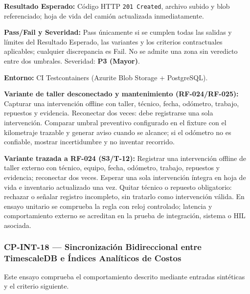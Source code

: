 \par\noindent\textbf{Resultado Esperado:} Código HTTP \texttt{2\allowbreak{}0\allowbreak{}1\allowbreak{} C\allowbreak{}r\allowbreak{}e\allowbreak{}a\allowbreak{}t\allowbreak{}e\allowbreak{}d\allowbreak{}}, archivo subido y blob referenciado; hoja de vida del camión actualizada inmediatamente.\par
\par\noindent\textbf{Pass/Fail y Severidad:} Pass únicamente si se cumplen todas las salidas y límites del Resultado Esperado, las variantes y los criterios contractuales aplicables; cualquier discrepancia es Fail. No se admite una zona sin veredicto entre dos umbrales. Severidad: \textbf{P3 (Mayor)}.\par
\par\noindent\textbf{Entorno:} CI Testcontainers (Azurite Blob Storage + PostgreSQL).\par




\par\noindent\textbf{Variante de taller desconectado y mantenimiento (RF-024/RF-025):} Capturar una intervención offline con taller, técnico, fecha, odómetro, trabajo, repuestos y evidencia. Reconectar dos veces: debe registrarse una sola intervención. Comparar umbral preventivo configurado en el fixture con el kilometraje trazable y generar aviso cuando se alcance; si el odómetro no es confiable, mostrar incertidumbre y no inventar recorrido.\par\par





\par\noindent\textbf{Variante trazada a RF-024 (S3/T-12):} Registrar una intervención offline de taller externo con técnico, equipo, fecha, odómetro, trabajo, repuestos y evidencia; reconectar dos veces. Esperar una sola intervención íntegra en hoja de vida e inventario actualizado una vez. Quitar técnico o repuesto obligatorio: rechazar o señalar registro incompleto, sin tratarlo como intervención válida. En ensayo unitario se comprueba la regla con reloj controlado; latencia y comportamiento externo se acreditan en la prueba de integración, sistema o HIL asociada.\par
\subsubsection*{CP-INT-18 — Sincronización Bidireccional entre TimescaleDB e Índices Analíticos de Costos}\label{sec:9-cp-int-18}
Este ensayo comprueba el comportamiento descrito mediante entradas sintéticas y el criterio siguiente.

